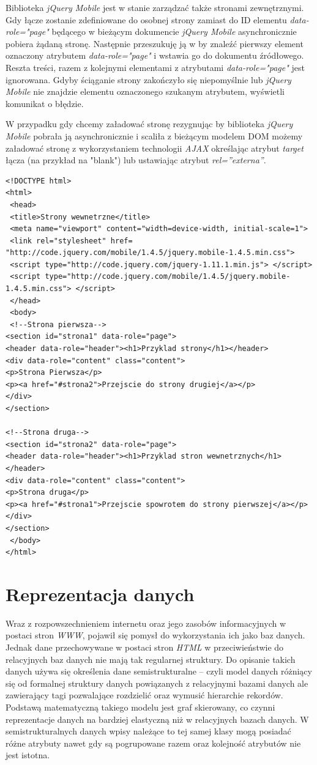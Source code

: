 \documentclass{iiuwb}
\begin{document}
Biblioteka \textit{jQuery Mobile} jest w stanie zarządzać także stronami zewnętrznymi. Gdy łącze zostanie zdefiniowane do osobnej strony zamiast do ID elementu \textit{data-role="page"} będącego w bieżącym dokumencie \textit{jQuery Mobile} asynchronicznie pobiera żądaną stronę. Następnie przeszukuję ją w by znaleźć pierwszy element oznaczony atrybutem \textit{data-role="page"} i wstawia go do dokumentu źródłowego. Reszta treści, razem z kolejnymi elementami z atrybutami \textit{data-role="page"} jest ignorowana. Gdyby ściąganie strony zakończyło się niepomyślnie lub \textit{jQuery Mobile} nie znajdzie elementu oznaczonego szukanym atrybutem, wyświetli komunikat o błędzie. 

W przypadku gdy chcemy załadować stronę rezygnując by biblioteka \textit{jQuery Mobile} pobrała ją asynchronicznie i scaliła z bieżącym modelem DOM możemy załadować stronę z wykorzystaniem technologii \textit{AJAX} określając atrybut \textit{target} łącza (na przykład na "blank") lub ustawiając atrybut \textit{rel=''externa''}\cite{Holzner:2008:AJAX}.
\clearpage
\begin{lstlisting}[label=Strony wewnętrzne, caption=W pojedynczym dokumencie HTML zawarte są dwie wewnętrzne strony]
<!DOCTYPE html> 
<html>
 <head>
 <title>Strony wewnetrzne</title>
 <meta name="viewport" content="width=device-width, initial-scale=1">
 <link rel="stylesheet" href= "http://code.jquery.com/mobile/1.4.5/jquery.mobile-1.4.5.min.css">
 <script type="http://code.jquery.com/jquery-1.11.1.min.js"> </script>
 <script type="http://code.jquery.com/mobile/1.4.5/jquery.mobile-1.4.5.min.css"> </script>
 </head> 
 <body>
 <!--Strona pierwsza-->
<section id="strona1" data-role="page">
<header data-role="header"><h1>Przyklad strony</h1></header> 
<div data-role="content" class="content">
<p>Strona Pierwsza</p>
<p><a href="#strona2">Przejscie do strony drugiej</a></p> 
</div>
</section>

<!--Strona druga-->
<section id="strona2" data-role="page">
<header data-role="header"><h1>Przyklad stron wewnetrznych</h1></header> 
<div data-role="content" class="content">
<p>Strona druga</p>
<p><a href="#strona1">Przejscie spowrotem do strony pierwszej</a></p> 
</div>
</section>
 </body> 
</html>
\end{lstlisting}
\section{Reprezentacja danych}
Wraz z rozpowszechnieniem internetu oraz jego zasobów informacyjnych w postaci stron \textit{WWW}, pojawił się pomysł do wykorzystania ich jako baz danych. Jednak dane przechowywane w postaci stron \textit{HTML} w przeciwieństwie do relacyjnych baz danych nie mają tak regularnej struktury. Do opisanie takich danych używa się określenia dane semistrukturalne -- czyli model danych różniący się od formalnej struktury danych powiązanych z relacyjnymi bazami danych ale zawierający tagi pozwalające rozdzielić oraz wymusić hierarchie rekordów. Podstawą matematyczną takiego modelu jest graf skierowany, co czynni reprezentacje danych na bardziej elastyczną niż w relacyjnych bazach danych. W semistrukturalnych danych wpisy należące to tej samej klasy mogą posiadać różne atrybuty nawet gdy są pogrupowane razem oraz kolejność atrybutów nie jest istotna. 
\end{document}
